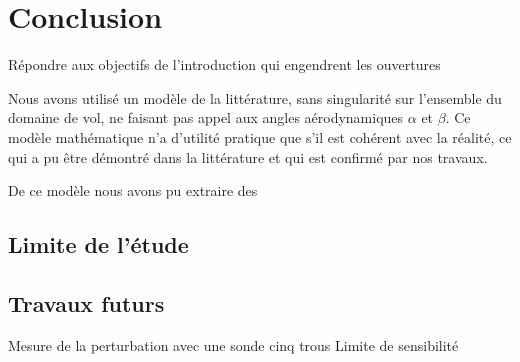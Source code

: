 \chapter*{Conclusion}
{ \color{red}
Répondre aux objectifs de l'introduction qui engendrent les ouvertures

Nous avons utilisé un modèle de la littérature, sans singularité sur l'ensemble du domaine de vol, ne faisant pas appel aux angles aérodynamiques $\alpha$ et $\beta$. Ce modèle mathématique n'a d'utilité pratique que s'il est cohérent avec la réalité, ce qui a pu être démontré dans la littérature et qui est confirmé par nos travaux.

De ce modèle nous avons pu extraire des

\section{Limite de l'étude}

\section{Travaux futurs}

Mesure de la perturbation avec une sonde cinq trous
Limite de sensibilité

}